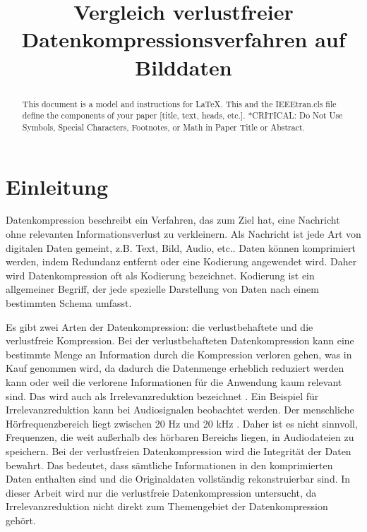 \documentclass[conference]{IEEEtran}
\begin{document}
\title{Vergleich verlustfreier Datenkompressionsverfahren auf Bilddaten}

\author{
}

\maketitle

\begin{abstract}
  This document is a model and instructions for \LaTeX.
  This and the IEEEtran.cls file define the components of your paper [title, text, heads, etc.]. *CRITICAL: Do Not Use Symbols, Special Characters, Footnotes,
  or Math in Paper Title or Abstract.
\end{abstract}



\section{Einleitung}

Datenkompression beschreibt ein Verfahren, das zum Ziel hat, eine Nachricht
ohne relevanten Informationsverlust zu verkleinern.
Als Nachricht ist jede Art von digitalen Daten gemeint, z.B. Text, Bild, Audio, etc..
Daten können komprimiert werden, indem Redundanz entfernt oder eine Kodierung angewendet wird.
Daher wird Datenkompression oft als Kodierung bezeichnet.
Kodierung ist ein allgemeiner Begriff, der jede spezielle Darstellung von Daten nach
einem bestimmten Schema umfasst. \cite{Ingles}

Es gibt zwei Arten der Datenkompression: die verlustbehaftete und die verlustfreie Kompression.
Bei der verlustbehafteten Datenkompression kann eine bestimmte Menge an Information durch die
Kompression verloren gehen, was in Kauf genommen wird, da dadurch die Datenmenge erheblich
reduziert werden kann oder weil die verlorene Informationen für die Anwendung kaum relevant sind.
Das wird auch als Irrelevanzreduktion bezeichnet \cite[S. 5]{Maluck}.
Ein Beispiel für Irrelevanzreduktion kann bei Audiosignalen beobachtet werden.
Der menschliche Hörfrequenzbereich liegt zwischen 20 Hz und 20 kHz \cite{Burke}.
Daher ist es nicht sinnvoll, Frequenzen, die weit außerhalb des hörbaren Bereichs liegen,
in Audiodateien zu speichern.
Bei der verlustfreien Datenkompression wird die Integrität der Daten bewahrt.
Das bedeutet, dass sämtliche Informationen in den komprimierten Daten enthalten sind
und die Originaldaten vollständig rekonstruierbar sind.
In dieser Arbeit wird nur die verlustfreie Datenkompression untersucht, da
Irrelevanzreduktion nicht direkt zum Themengebiet der Datenkompression gehört.
\end{document}
